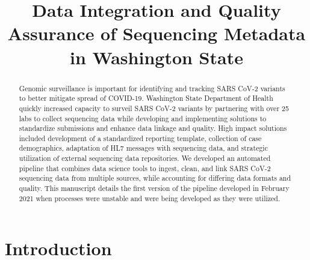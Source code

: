 \documentclass[
]{agujournal2019}
\begin{document}
\title{Data Integration and Quality Assurance of Sequencing Metadata in
Washington State}





\begin{abstract}
Genomic surveillance is important for identifying and tracking SARS
CoV-2 variants to better mitigate spread of COVID-19. Washington State
Department of Health quickly increased capacity to surveil SARS CoV-2
variants by partnering with over 25 labs to collect sequencing data
while developing and implementing solutions to standardize submissions
and enhance data linkage and quality. High impact solutions included
development of a standardized reporting template, collection of case
demographics, adaptation of HL7 messages with sequencing data, and
strategic utilization of external sequencing data repositories. We
developed an automated pipeline that combines data science tools to
ingest, clean, and link SARS CoV-2 sequencing data from multiple
sources, while accounting for differing data formats and quality. This
manuscript details the first version of the pipeline developed in
February 2021 when processes were unstable and were being developed as
they were utilized.
\end{abstract}





\section{Introduction}\label{introduction}
\end{document}
